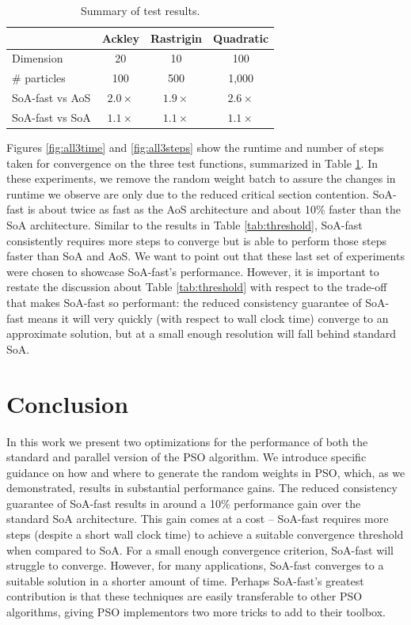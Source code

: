 \begin{table}
  \centering
  \caption{Summary of test results.}
  \label{tab:results}
  \begin{tabular}{lccc}\toprule
    & \textbf{Ackley} & \textbf{Rastrigin} & \textbf{Quadratic}\\\midrule
    Dimension & 20 & 10 & 100\\
    \# particles & 100 & 500 & 1,000\\
    SoA-fast vs AoS & $2.0\times$ & $1.9\times$ & $2.6\times$\\
    SoA-fast vs SoA & $1.1\times$ & $1.1\times$ & $1.1\times$\\\bottomrule
  \end{tabular}
\end{table}

Figures \ref{fig:all3time} and \ref{fig:all3steps} show the runtime and number
of steps taken for convergence on the three test functions, summarized in Table
\ref{tab:results}.
In these experiments, we remove the random weight batch to assure the changes in
runtime we observe are only due to the reduced critical section contention.
SoA-fast is about twice as fast as the AoS architecture and
about 10\% faster than the SoA architecture. Similar to the results in Table
\ref{tab:threshold}, SoA-fast consistently requires more steps to converge but
is able to perform those steps faster than SoA and AoS. We want to point out
that these last set of experiments were chosen to showcase SoA-fast's performance.
However, it is important to restate the discussion about Table \ref{tab:threshold}
with respect to the trade-off that makes SoA-fast so performant: the reduced
consistency guarantee of SoA-fast means it will very quickly (with respect to
wall clock time) converge to an approximate solution, but at a small enough
resolution will fall behind standard SoA.

\section{Conclusion}
In this work we present two optimizations for the performance of both the
standard and parallel version of the PSO algorithm. We introduce
specific guidance on how and where to generate the random weights in
PSO, which, as we demonstrated, results in substantial performance gains. 
The reduced consistency guarantee of SoA-fast results in around a 10\% performance
gain over the standard SoA architecture. This gain comes at a cost -- SoA-fast
requires more steps (despite a short wall clock time) to achieve a suitable
convergence threshold when compared to SoA. For a small enough convergence
criterion, SoA-fast will struggle to converge. However, for many applications,
SoA-fast converges to a suitable solution in a shorter amount of time. Perhaps
SoA-fast's greatest contribution is that these techniques are easily transferable
to other PSO algorithms, giving PSO implementors two more tricks to add to their
toolbox.


